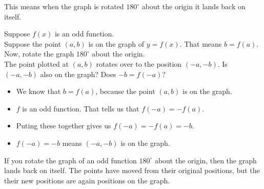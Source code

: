 \documentclass{ximera}
\begin{document}
This means when the graph is rotated $180^\circ$ about the origin it lands back on itself.


\begin{explanation}

Suppose $f(x)$ is an odd function. \\
Suppose the point $(a, b)$ is on the graph of $y = f(x)$. That means $b = f(a)$.  \\

Now, rotate the graph $180^{\circ}$ about the origin. \\

The point plotted at $(a,b)$ rotates over to the position $(-a,-b)$.  Is $(-a,-b)$ also on the graph?  Does $-b = f(-a)$?


\begin{itemize}
\item We know that $b = f(a)$, because the point $(a,b)$ is on the graph.
\item $f$ is an odd function.   That tells us that $f(-a) = -f(a)$.
\item Puting these together gives us $f(-a) = -f(a) = -b$.
\item $f(-a) = -b$ means $(-a, -b)$ is on the graph.
\end{itemize}


If you rotate the graph of an odd function $180^{\circ}$ about the origin, then the graph lands back on itself.  The points have moved from their original positions, but the their new positions are again positions on the graph.





\end{explanation}
\end{document}

